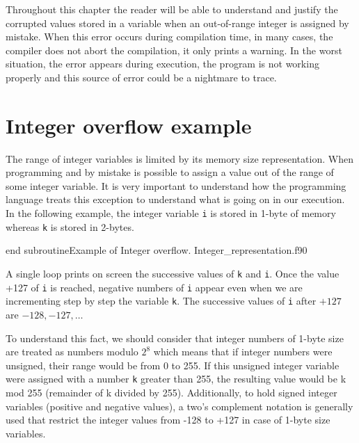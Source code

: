 Throughout this chapter the reader will be able to understand and justify the corrupted values stored in a variable when an out-of-range integer is assigned by mistake. When this error occurs during compilation time, in many cases, the compiler does not abort the compilation, it only prints a warning. In the worst situation, the error appears during execution, the program is not working properly and this source of error could be a nightmare to trace.
 
 
 
   
\newpage
    \section{Integer overflow example}


The range of integer variables is limited by its memory size representation. 
When programming and by mistake is possible to assign a value out of the
range of some integer variable.
It is very important to understand how the programming language treats this exception 
to understand what is going on in our execution. 
In the following example, the integer variable \texttt{i} is stored in 1-byte 
 of memory 
whereas  \texttt{k} is stored in 2-bytes.

\vspace{0.5cm}

{end subroutine}{Example of Integer overflow. Integer_representation.f90}



A single loop prints on screen 
the successive values of \texttt{k} and \texttt{i}. Once the value +127 
of \texttt{i} is reached, negative numbers of \texttt{i} appear even when we are
incrementing step by step the variable \texttt{k}.  
The successive  values of \texttt{i} after $+127$ are $-128, -127,  \dots$ 

To understand this fact, we should consider that integer numbers of 1-byte size 
are treated as numbers 
modulo $ 2^8 $ which means that if integer numbers were unsigned, their range would be 
from 0 to 255. 
If this unsigned integer variable were assigned with a number \texttt{k}
greater than 255, the resulting value would be k mod 255 (remainder of k divided by 255). 
Additionally, 
to hold signed integer variables (positive and negative values), 
a two's complement notation is generally used 
that restrict the integer values from -128 to +127 in case of 1-byte size variables. 
 




